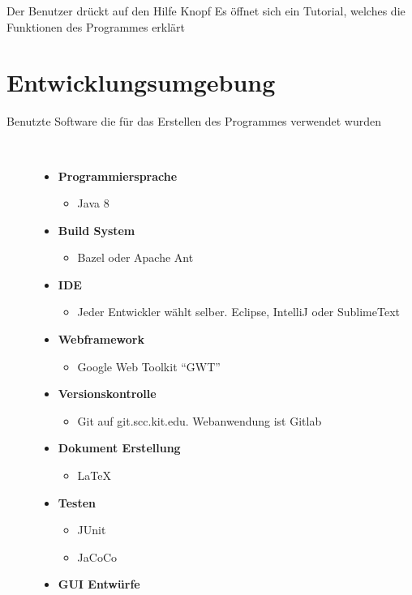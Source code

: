 \documentclass[parskip=full,11pt,twoside]{scrartcl}
\begin{document}
{Der Benutzer drückt auf den Hilfe Knopf}
{Es öffnet sich ein Tutorial, welches die Funktionen des Programmes erklärt}

\newpage
\section{Entwicklungsumgebung}
  \begin{description}
	\item[Benutzte Software die für das Erstellen des Programmes verwendet wurden]~\par
	\begin{itemize}
		\item \textbf{Programmiersprache}
		\begin{itemize}
			\item Java 8
		\end{itemize}
		\item \textbf{Build System}
		\begin{itemize}
			\item Bazel oder Apache Ant
		\end{itemize}
		\item \textbf{IDE}
		\begin{itemize}
			\item Jeder Entwickler wählt selber. Eclipse, IntelliJ oder SublimeText
		\end{itemize}
		\item \textbf{Webframework}
		\begin{itemize}
			\item Google Web Toolkit \enquote{GWT}
		\end{itemize}
		\item \textbf{Versionskontrolle}
		\begin{itemize}
			\item Git auf git.scc.kit.edu. Webanwendung ist Gitlab
		\end{itemize}
		\item \textbf{Dokument Erstellung}
		\begin{itemize}
			\item LaTeX
		\end{itemize}
		\item \textbf{Testen}
		\begin{itemize}
			\item JUnit
			\item JaCoCo
		\end{itemize}
		\item \textbf{GUI Entwürfe}

\end{itemize}
\end{description}
\end{document}
